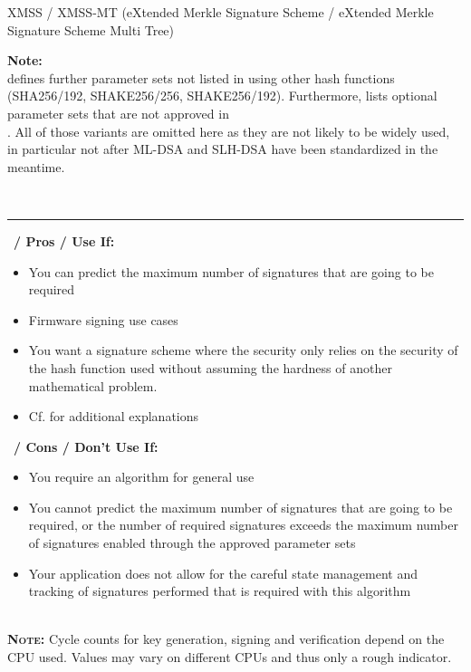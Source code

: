 \documentclass[11pt,english,a4paper, landscape]{scrartcl}
\begin{document}
\begin{algorithmbox}{XMSS / XMSS-MT (eXtended Merkle Signature Scheme / eXtended Merkle Signature Scheme Multi Tree)}
\begin{minipage}[t]{0.64\textwidth}
			{\bfseries Note:}\\
			\normalfont{} defines further parameter sets not listed in  using other hash functions (SHA256/192, SHAKE256/256, SHAKE256/192). Furthermore,  lists optional parameter sets that are not approved in\\ . All of those variants are omitted here as they are not likely to be widely used, in particular not after ML-DSA and SLH-DSA have been standardized in the meantime.
		\end{minipage}\\
		\hrule
		\vspace{1\baselineskip}
		\begin{minipage}[t]{0.49\textwidth}
			\scriptsize\faThumbsUp\, {\bfseries / Pros / Use If:}
			\begin{itemize}[leftmargin=*]
				\setlength\itemsep{0em}
				\item You can predict the maximum number of signatures that are going to be required
				\item Firmware signing use cases
				\item You want a signature scheme where the security only relies on the security of the hash function used without assuming the hardness of another mathematical problem.
				\item Cf.  for additional explanations
			\end{itemize}
		\end{minipage}
		\hfill
		\begin{minipage}[t]{0.49\textwidth}
			\scriptsize \faThumbsDown\, {\bfseries / Cons / Don't Use If:}
			\begin{itemize}[leftmargin=*]
				\setlength\itemsep{0em}
				\item You require an algorithm for general use
				\item You cannot predict the maximum number of signatures that are going to be required, or the number of required signatures exceeds the maximum number of signatures enabled through the approved parameter sets
				\item Your application does not allow for the careful state management and tracking of signatures performed that is required with this algorithm
			\end{itemize}
		\end{minipage}\\[\baselineskip]

		{\tiny  {\bfseries \scshape Note:} Cycle counts for key generation, signing and verification depend on the CPU used. Values may vary on different CPUs and thus only a rough indicator.}
	\end{algorithmbox}
\end{document}
